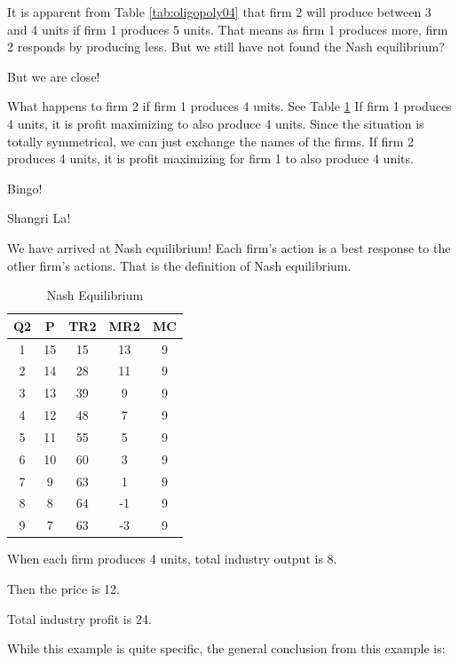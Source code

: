 \documentclass[
]{book}
\begin{document}
It is apparent from Table \ref{tab:oligopoly04} that firm 2 will produce between 3 and 4 units if firm 1 produces 5 units. That means as firm 1 produces more, firm 2 responds by producing less. But we still have not found the Nash equilibrium?

But we are close!

What happens to firm 2 if firm 1 produces 4 units. See Table \ref{tab:oligopoly05} If firm 1 produces 4 units, it is profit maximizing to also produce 4 units. Since the situation is totally symmetrical, we can just exchange the names of the firms. If firm 2 produces 4 units, it is profit maximizing for firm 1 to also produce 4 units.

Bingo!

Shangri La!

We have arrived at Nash equilibrium! Each firm's action is a best response to the other firm's actions. That is the definition of Nash equilibrium.

\begin{table}

\caption{\label{tab:oligopoly05}Nash Equilibrium}
\centering
\begin{tabular}[t]{c|c|c|c|c}
\hline
Q2 & P & TR2 & MR2 & MC\\
\hline
1 & 15 & 15 & 13 & 9\\
\hline
2 & 14 & 28 & 11 & 9\\
\hline
3 & 13 & 39 & 9 & 9\\
\hline
4 & 12 & 48 & 7 & 9\\
\hline
5 & 11 & 55 & 5 & 9\\
\hline
6 & 10 & 60 & 3 & 9\\
\hline
7 & 9 & 63 & 1 & 9\\
\hline
8 & 8 & 64 & -1 & 9\\
\hline
9 & 7 & 63 & -3 & 9\\
\hline
\end{tabular}
\end{table}

When each firm produces 4 units, total industry output is 8.

Then the price is 12.

Total industry profit is 24.

While this example is quite specific, the general conclusion from this example is:
\end{document}
